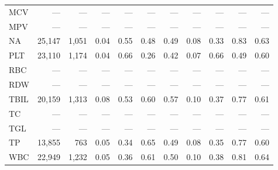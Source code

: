 \begin{table}[ht]
\begin{tabular}{lrrrrrrrrrr}
MCV & --- & --- & --- & --- & --- & --- & --- & --- & --- & --- \\
MPV & --- & --- & --- & --- & --- & --- & --- & --- & --- & --- \\
NA & 25,147 & 1,051 & 0.04 & 0.55 & 0.48 & 0.49 & 0.08 & 0.33 & 0.83 & 0.63 \\
PLT & 23,110 & 1,174 & 0.04 & 0.66 & 0.26 & 0.42 & 0.07 & 0.66 & 0.49 & 0.60 \\
RBC & --- & --- & --- & --- & --- & --- & --- & --- & --- & --- \\
RDW & --- & --- & --- & --- & --- & --- & --- & --- & --- & --- \\
TBIL & 20,159 & 1,313 & 0.08 & 0.53 & 0.60 & 0.57 & 0.10 & 0.37 & 0.77 & 0.61 \\
TC & --- & --- & --- & --- & --- & --- & --- & --- & --- & --- \\
TGL & --- & --- & --- & --- & --- & --- & --- & --- & --- & --- \\
TP & 13,855 & 763 & 0.05 & 0.34 & 0.65 & 0.49 & 0.08 & 0.35 & 0.77 & 0.60 \\
WBC & 22,949 & 1,232 & 0.05 & 0.36 & 0.61 & 0.50 & 0.10 & 0.38 & 0.81 & 0.64 \\
\bottomrule
\end{tabular}
\label{tab:12_eval_detail_inspire_periop_infection}
\end{table}